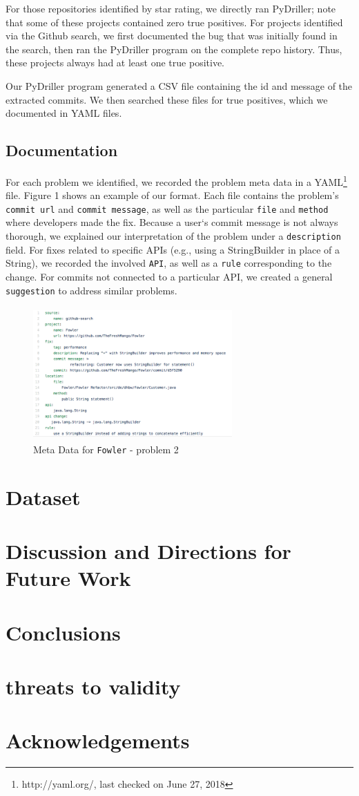 \documentclass[sigconf]{acmart}
\begin{document}


For those repositories identified by star rating, we directly ran PyDriller; note that some of these projects contained zero true positives. For projects identified via the Github search, we first documented the bug that was initially found in the search, then ran the PyDriller program on the complete repo history. Thus, these projects always had at least one true positive. 

Our PyDriller program generated a CSV file containing the id and message of the extracted commits. We then searched these files for true positives, which we documented in YAML files. 

\subsection{Documentation}
For each problem we identified, we recorded the problem meta data in a YAML\footnote{http://yaml.org/, last checked on June 27, 2018} file. Figure 1 shows an example of our format. Each file contains the problem's \texttt{commit url} and \texttt{commit message}, as well as the particular \texttt{file} and \texttt{method} where developers made the fix. Because a user`s commit message is not always thorough, we explained our interpretation of the problem under a \texttt{description} field. For fixes related to specific APIs (e.g., using a StringBuilder in place of  a String), we recorded the involved \texttt{API}, as well as a \texttt{rule} corresponding to the change. For commits not connected to a particular API, we created a general \texttt{suggestion} to address similar problems.

\begin{figure}
\includegraphics[height=2in, width=3in]{YAMLmetadata}
\caption{Meta Data for \texttt{Fowler} - problem 2}
\end{figure}


\section{Dataset}
\section{Discussion and Directions for Future Work}
\section{Conclusions}
\section*{threats to validity}


\section*{Acknowledgements}




\end{document}
